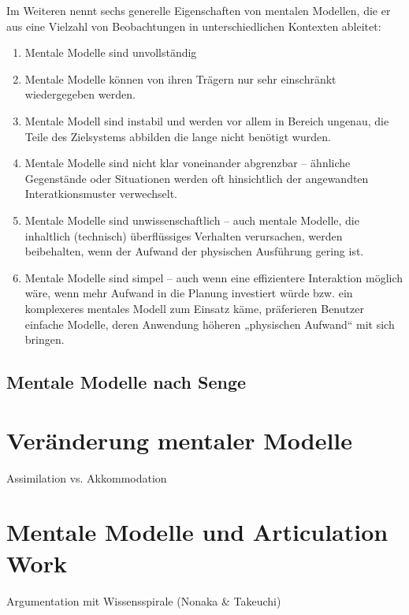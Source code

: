 Im Weiteren nennt \citeauthor{Norman83a} sechs generelle Eigenschaften von mentalen Modellen, die er aus eine Vielzahl von Beobachtungen in unterschiedlichen Kontexten ableitet:
\begin{enumerate}
	\item Mentale Modelle sind unvollständig
	\item Mentale Modelle können von ihren Trägern nur sehr einschränkt wiedergegeben werden.
	\item Mentale Modell sind instabil und werden vor allem in Bereich ungenau, die Teile des Zielsystems abbilden die lange nicht benötigt wurden.
	\item Mentale Modelle sind nicht klar voneinander abgrenzbar -- ähnliche Gegenstände oder Situationen werden oft hinsichtlich der angewandten Interatkionsmuster verwechselt.
	\item Mentale Modelle sind unwissenschaftlich -- auch mentale Modelle, die inhaltlich (technisch) überflüssiges Verhalten verursachen, werden beibehalten, wenn der Aufwand der physischen Ausführung gering ist.
	\item Mentale Modelle sind simpel -- auch wenn eine effizientere Interaktion möglich wäre, wenn mehr Aufwand in die Planung investiert würde bzw. ein komplexeres mentales Modell zum Einsatz käme, präferieren Benutzer einfache Modelle, deren Anwendung höheren „physischen Aufwand“ mit sich bringen.
\end{enumerate}


\subsection{Mentale Modelle nach Senge} %
\label{sub:mentale_modelle_nach_senge}


\section{Veränderung mentaler Modelle}
\label{sub:veränderung_mentaler_modelle}
Assimilation vs. Akkommodation

\section{Mentale Modelle und Articulation Work}
\label{sec:mentale_modelle_und_articulation_work}

Argumentation mit Wissensspirale (Nonaka \& Takeuchi)
